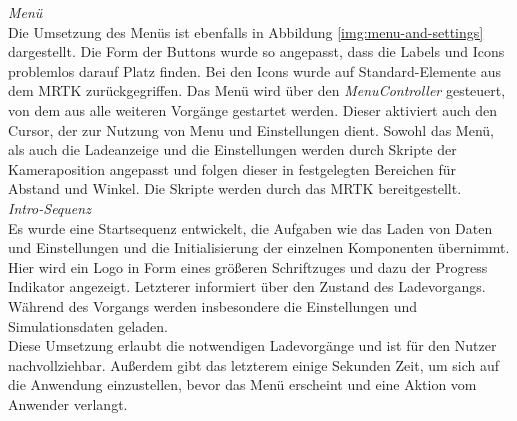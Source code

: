 \textit{Menü}\\
Die Umsetzung des Menüs ist ebenfalls in Abbildung \ref{img:menu-and-settings} dargestellt. Die Form der Buttons wurde so angepasst, dass die Labels und Icons problemlos darauf Platz finden. Bei den Icons wurde auf Standard-Elemente aus dem MRTK zurückgegriffen. Das Menü wird über den \textit{MenuController} gesteuert, von dem aus alle weiteren Vorgänge gestartet werden. Dieser aktiviert auch den Cursor, der zur Nutzung von Menu und Einstellungen dient. Sowohl das Menü, als auch die Ladeanzeige und die Einstellungen werden durch Skripte der Kameraposition angepasst und folgen dieser in festgelegten Bereichen für Abstand und Winkel. Die Skripte werden durch das MRTK bereitgestellt.\\

\textit{Intro-Sequenz}\\
Es wurde eine Startsequenz entwickelt, die Aufgaben wie das Laden von Daten und Einstellungen und die Initialisierung der einzelnen Komponenten übernimmt. Hier wird ein Logo in Form eines größeren Schriftzuges und dazu der Progress Indikator angezeigt. Letzterer informiert über den Zustand des Ladevorgangs. Während des Vorgangs werden insbesondere die Einstellungen und Simulationsdaten geladen.\\

Diese Umsetzung erlaubt die notwendigen Ladevorgänge und ist für den Nutzer nachvollziehbar. Außerdem gibt das letzterem einige Sekunden Zeit, um sich auf die Anwendung einzustellen, bevor das Menü erscheint und eine Aktion vom Anwender verlangt.

\vspace{8px}
\begin{center}
	\\
\end{center}
\vspace{6px}

